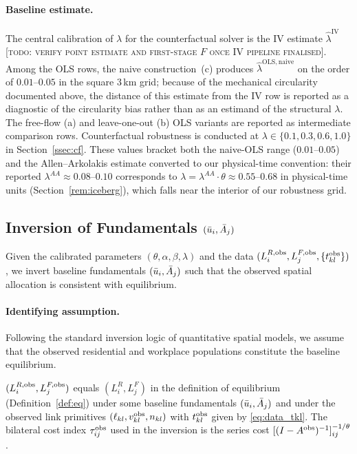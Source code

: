 \paragraph{Baseline estimate.}
The central calibration of $\lambda$ for the counterfactual solver
is the IV estimate $\hat\lambda^{\mathrm{IV}}$
[\textsc{todo: verify point estimate and first-stage $F$ once IV
pipeline finalised}].  Among the OLS rows, the naive construction~(c)
produces $\hat\lambda^{\mathrm{OLS,naive}}$ on the order of
$0.01$--$0.05$ in the square 3\,km grid; because of the mechanical
circularity documented above, the distance of this estimate from the
IV row is reported as a diagnostic of the circularity bias rather
than as an estimand of the structural $\lambda$.  The free-flow
(a) and leave-one-out (b) OLS variants are reported as intermediate
comparison rows.  Counterfactual robustness is conducted at
$\lambda\in\{0.1,0.3,0.6,1.0\}$ in Section~\ref{ssec:cf}.  These values
bracket both the naive-OLS range ($0.01$--$0.05$) and the
Allen--Arkolakis estimate converted to our physical-time convention:
their reported $\lambda^{AA}\approx 0.08$--$0.10$ corresponds to
$\lambda=\lambda^{AA}\cdot\theta\approx 0.55$--$0.68$ in physical-time
units (Section~\ref{rem:iceberg}), which falls near the interior of our
robustness grid.

\subsection{Inversion of Fundamentals $(\bar u_i,\bar A_j)$}\label{ssec:invert}

Given the calibrated parameters $(\theta,\alpha,\beta,\lambda)$ and
the data $(L_i^{R,\mathrm{obs}},L_j^{F,\mathrm{obs}},\{t_{kl}^{\mathrm{obs}}\})$, we invert
baseline fundamentals $(\bar u_i,\bar A_j)$ such that the observed
spatial allocation is consistent with equilibrium.

\paragraph{Identifying assumption.}
Following the standard inversion logic of quantitative spatial
models, we assume that the observed residential and workplace
populations constitute the baseline equilibrium.

\begin{assumption}
\label{ass:obs_eq}
$(L_i^{R,\mathrm{obs}},L_j^{F,\mathrm{obs}})$ equals $(L_i^R,L_j^F)$ in the
definition of equilibrium (Definition~\ref{def:eq}) under some
baseline fundamentals $(\bar u_i,\bar A_j)$ and under the observed
link primitives $(\ell_{kl},v_{kl}^{\mathrm{obs}},n_{kl})$ with
$t_{kl}^{\mathrm{obs}}$ given by \eqref{eq:data_tkl}.  The bilateral cost
index $\tau_{ij}^{\mathrm{obs}}$ used in the inversion is the series cost
$[(I-A^{\mathrm{obs}})^{-1}]_{ij}^{-1/\theta}$.
\end{assumption}

